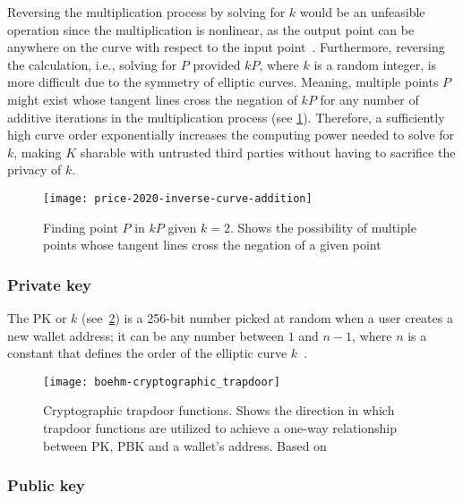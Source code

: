 Reversing the multiplication process by solving for $k$ would be an unfeasible operation since the multiplication is nonlinear, as the output point can be anywhere on the curve with respect to the input point~\autocite{price_bitcoins_2020}.
Furthermore, reversing the calculation, i.e., solving for $P$ provided $kP$, where $k$ is a random integer, is more difficult due to the symmetry of elliptic curves.
Meaning, multiple points $P$ might exist whose tangent lines cross the negation of $kP$ for any number of additive iterations in the multiplication process (see \cref{fig:finding-point-p}).
Therefore, a sufficiently high curve order exponentially increases the computing power needed to solve for $k$, making $K$ sharable with untrusted third parties without having to sacrifice the privacy of $k$.

\begin{figure}[H]
    \begin{center}
        \texttt{[image: price-2020-inverse-curve-addition]}
    \end{center}
    \caption[Finding point $P$ in $kP$ given $k=2$]{Finding point $P$ in $kP$ given $k=2$.
    Shows the possibility of multiple points whose tangent lines cross the negation of a given point~\autocite{price_bitcoins_2020}}
    \label{fig:finding-point-p}
\end{figure}

\subsubsection{Private key}\label{subsubsec:private-key}

The \gls{PK} or $k$ (see~\cref{fig:elliptic-curve-trapdoor}) is a 256-bit number picked at random when a user creates a new wallet address;
it can be any number between $1$ and $n-1$, where $n$ is a constant that defines the order of the elliptic curve $k$~\autocite[63]{antonopoulos_mastering_2017}.

\begin{figure}[H]
    \texttt{[image: boehm-cryptographic\_trapdoor]}
    \caption[Cryptographic trapdoor functions]{Cryptographic trapdoor functions. Shows the direction in which trapdoor functions are utilized to achieve a one-way relationship between \gls{PK}, \gls{PBK} and a wallet's address. Based on~\textcite[160]{antonopoulos_mastering_2017}}
    \label{fig:elliptic-curve-trapdoor}
\end{figure}

\subsubsection{Public key}\label{subsubsec:public-key}


